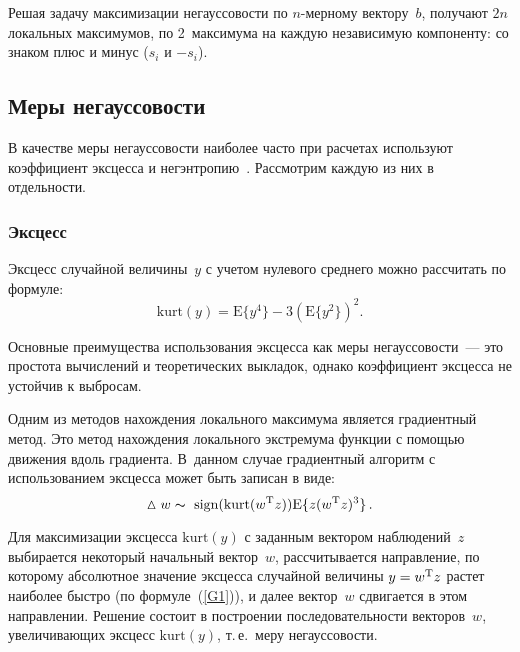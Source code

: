 \begin{multicols}{2}
Решая задачу максимизации негауссовости по $n$-мер\-но\-му вектору~$b$,
получают $2n$ локальных максимумов, по 2~максимума на каждую
независимую компоненту: со знаком плюс и минус ($s_i$ и $-s_i$).

\vspace*{-4pt}

\subsection{Меры негауссовости}

В качестве меры негауссовости наиболее часто при расчетах используют
коэффициент эксцесса и негэнтропию~\cite{ICA}. Рассмотрим каждую из
них в отдельности.

\vspace*{-6pt}

\subsubsection{Эксцесс}

Эксцесс случайной величины~$y$ с учетом нулевого среднего можно
рассчитать по формуле:
$$
\mathrm{kurt}(y) = \mathrm{E}\lbrace y^{4}\rbrace -
3(\mathrm{E}\lbrace y^{2}\rbrace )^{2}.
$$

Основные преимущества использования эксцесса как меры негауссовости~---
это простота вычислений и теоретических выкладок, однако
коэффициент эксцесса не устойчив к выбросам.

Одним из методов нахождения локального максимума является
градиентный метод. Это метод нахождения локального экстремума
функции с помощью движения вдоль градиента. В~данном случае
градиентный алгоритм с использованием эксцесса может быть записан в
виде:
\begin{equation}
\label{G1}
\vartriangle w \thicksim \mathrm{sign}
( \mathrm{kurt}(w^{\mathrm{T}}z)) \mathrm{E}\lbrace z(w^{\mathrm{T}}z)^3\rbrace \,.
\end{equation}

Для максимизации  эксцесса $\mathrm{kurt}(y)$ с заданным вектором
наблюдений~$z$ выбирается некоторый начальный вектор~$w$,
рассчитывается направление, по которому абсолютное значение эксцесса
случайной величины $y \hm= w^{\mathrm{T}}z$ растет наиболее быстро (по формуле~(\ref{G1})),
и далее вектор~$w$ сдвигается в этом направлении.
Решение состоит в построении последовательности векторов~$w$,
увеличивающих эксцесс $\mathrm{kurt}(y)$, т.\,е.\ меру негауссовости.

\vspace*{-6pt}


\end{multicols}
